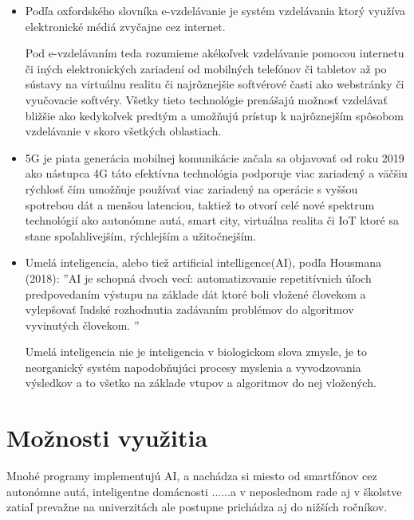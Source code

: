 \documentclass[10pt,oneside,slovak,a4paper]{article}
\begin{document}
\begin{itemize}
\item Podľa oxfordského slovníka e-vzdelávanie je systém vzdelávania ktorý využíva elektronické médiá zvyčajne cez internet. 

Pod e-vzdelávaním teda rozumieme akékoľvek vzdelávanie pomocou internetu či iných elektronických zariadení od mobilných telefónov či tabletov až po sústavy na virtuálnu realitu či najrôznejšie softvérové časti ako webstránky či vyučovacie softvéry. Všetky tieto technológie prenášajú možnosť vzdelávať bližšie ako kedykoľvek predtým a umožňujú prístup k najrôznejším spôsobom vzdelávanie v skoro všetkých oblastiach.


\item 
5G je piata generácia mobilnej komunikácie začala sa objavovať od roku 2019 ako nástupca 4G táto efektívna technológia podporuje viac zariadený a väčšiu rýchlosť čím umožňuje používať viac zariadený na operácie s vyššou spotrebou dát a menšou latenciou, taktiež to otvorí celé nové spektrum technológií ako autonómne autá, smart city, virtuálna realita či IoT ktoré sa stane spoľahlivejším, rýchlejším a užitočnejším.
\item 
Umelá inteligencia, alebo tiež artificial intelligence(AI), podľa Housmana (2018): ''AI je schopná dvoch vecí: automatizovanie repetitívnich úľoch predpovedaním výstupu na základe dát ktoré boli vložené človekom a vylepšovať ľudské rozhodnutia zadávaním problémov do algoritmov vyvinutých človekom. ''

Umelá inteligencia nie je inteligencia v biologickom slova zmysle, je to neorganický systém napodobňujúci procesy myslenia a vyvodzovania výsledkov a to všetko na základe vtupov a algoritmov do nej vložených.  
 



\end{itemize}

\section{Možnosti využitia} 
Mnohé programy implementujú AI, a nachádza si miesto od smartfónov cez autonómne autá, inteligentne domácnosti ......a v neposlednom rade aj v školstve zatiaľ prevažne na univerzitách ale postupne prichádza aj do nižších ročníkov.
\end{document}

